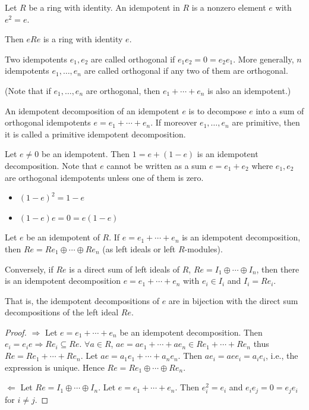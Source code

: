 \documentclass[11pt, a4paper]{report}
\begin{document}
\begin{definition}[Idempotent]
Let $R$ be a ring with identity. An idempotent in $R$ is a nonzero element $e$ with $e^{2}=e$.

Then $eRe$ is a ring with identity $e$.

Two idempotents $e_{1}, e_{2}$ are called orthogonal if $e_{1} e_{2}=0=e_{2} e_{1}$. More generally, $n$ idempotents $e_{1}, \ldots, e_{n}$ are called orthogonal if any two of them are orthogonal.

(Note that if $e_{1}, \ldots, e_{n}$ are orthogonal, then $e_{1}+\cdots+e_{n}$ is also an idempotent.)

An idempotent decomposition of an idempotent $e$ is to decompose $e$ into a sum of orthogonal idempotents $e=e_{1}+\cdots+e_{n}$. If moreover $e_{1}, \ldots, e_{n}$ are primitive, then it is called a primitive idempotent decomposition.
\end{definition}

\begin{remark}
Let $e \neq 0$ be an idempotent. Then $1=e+(1-e)$ is an idempotent decomposition. Note that $e$ cannot be written as a sum $e=e_{1}+e_{2}$ where $e_{1}, e_{2}$ are orthogonal idempotents unless one of them is zero.
\begin{itemize}
\item $(1-e)^{2}=1-e$
\item $(1-e)e=0=e(1-e)$
\end{itemize}
\end{remark}

\begin{theorem}
Let $e$ be an idempotent of $R$. If $e=e_{1}+\cdots+e_{n}$ is an idempotent decomposition, then $Re=Re_{1} \oplus \cdots \oplus Re_{n}$ (as left ideals or left $R$-modules).

Conversely, if $Re$ is a direct sum of left ideals of $R$, $Re=I_{1} \oplus \cdots \oplus I_{n}$, then there is an idempotent decomposition $e=e_{1}+\cdots+e_{n}$ with $e_{i} \in I_{i}$ and $I_{i}=Re_{i}$.

That is, the idempotent decompositions of $e$ are in bijection with the direct sum decompositions of the left ideal $Re$.
\end{theorem}
\begin{proof}
$\Rightarrow$ Let $e=e_{1}+\cdots+e_{n}$ be an idempotent decomposition. Then $e_{i}=e_{i}e \Rightarrow Re_{i} \subseteq Re$. $\forall a \in R$, $ae=ae_{1}+\cdots+ae_{n} \in Re_{1}+\cdots+Re_{n}$ thus $Re=Re_{1}+\cdots+Re_{n}$. Let $ae=a_{1}e_{1}+\cdots+a_{n}e_{n}$. Then $ae_{i}=aee_{i}=a_{i}e_{i}$, i.e., the expression is unique. Hence $Re=Re_{1} \oplus \cdots \oplus Re_{n}$.

$\Leftarrow$ Let $Re=I_{1} \oplus \cdots \oplus I_{n}$. Let $e=e_{1}+\cdots+e_{n}$. Then $e_{i}^{2}=e_{i}$ and $e_{i}e_{j}=0=e_{j}e_{i}$ for $i \neq j$.
\end{proof}
\end{document}
